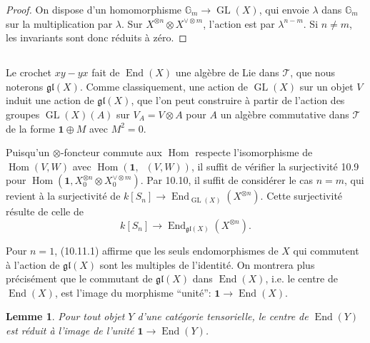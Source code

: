 \documentclass[11pt,a4paper]{article}
\theoremstyle{plain}
\newtheorem{lemma}[theorem]{Lemme}
\theoremstyle{definition}
\DeclareMathOperator{\Hom}{Hom}
\DeclareMathOperator{\End}{End}
\DeclareMathOperator{\GL}{GL}
\DeclareMathOperator{\iHom}{\underline{Hom}}
\begin{document}
\begin{proof}
On dispose d'un homomorphisme $\mathbb{G}_m \to \GL(X)$, qui envoie $\lambda$ dans $\mathbb{G}_m$ sur la multiplication par $\lambda$. Sur $X^{\otimes n} \otimes X^{\vee \otimes m}$, l'action est par $\lambda^{n-m}$. Si $n \neq m$, les invariants sont donc r\'eduits \`a z\'ero.
\end{proof}

\subsection{}
Le crochet $xy - yx$ fait de $\End(X)$ une alg\`ebre de Lie dans $\mathcal{T}$, que nous noterons $\mathfrak{gl}(X)$. Comme classiquement, une action de $\GL(X)$ sur un objet $V$ induit une action de $\mathfrak{gl}(X)$, que l'on peut construire \`a partir de l'action des groupes $\GL(X)(A)$ sur $V_A = V \otimes A$ pour $A$ un alg\`ebre commutative dans $\mathcal{T}$ de la forme $\mathbf{1} \oplus M$ avec $M^2 = 0$.

Puisqu'un $\otimes$-foncteur commute aux $\Hom$ respecte l'isomorphisme de $\Hom(V, W)$ avec $\Hom(\mathbf{1}, \iHom(V, W))$, il suffit de v\'erifier la surjectivit\'e 10.9 pour $\Hom(\mathbf{1}, X_0^{\otimes n} \otimes X_0^{\vee \otimes m})$. Par 10.10, il suffit de consid\'erer le cas $n = m$, qui revient \`a la surjectivit\'e de $k[S_n] \to \End_{\GL(X)}(X^{\otimes n})$. Cette surjectivit\'e r\'esulte de celle de
\begin{equation}
k[S_n] \to \End_{\mathfrak{gl}(X)}(X^{\otimes n}). \tag{10.11.1}
\end{equation}

Pour $n = 1$, (10.11.1) affirme que les seuls endomorphismes de $X$ qui commutent \`a l'action de $\mathfrak{gl}(X)$ sont les multiples de l'identit\'e. On montrera plus pr\'ecis\'ement que le commutant de $\mathfrak{gl}(X)$ dans $\End(X)$, i.e. le centre de $\End(X)$, est l'image du morphisme ``unit\'e'': $\mathbf{1} \to \End(X)$.

\begin{lemma}
Pour tout objet $Y$ d'une cat\'egorie tensorielle, le centre de $\End(Y)$ est r\'eduit \`a l'image de l'unit\'e $\mathbf{1} \to \End(Y)$.
\end{lemma}
\end{document}
